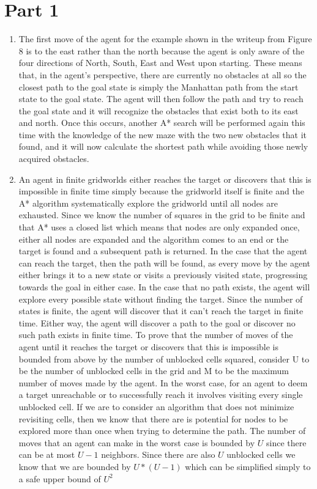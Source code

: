 \documentclass{article}
\begin{document}
\section*{Part 1}
\begin{enumerate}[label=\alph*.]
    \item  The first move of the agent for the example shown in the writeup from Figure 8 is to the east rather than the north because the agent is only aware of the four directions of North, South, East and West upon starting. These means that, in the agent's perspective, there are currently no obstacles at all so the closest path to the goal state is simply the Manhattan path from the start state to the goal state. The agent will then follow the path and try to reach the goal state and it will recognize the obstacles that exist both to its east and north. Once this occurs, another A* search will be performed again this time with the knowledge of the new maze with the two new obstacles that it found, and it will now calculate the shortest path while avoiding those newly acquired obstacles.

    \item An agent in finite gridworlds either reaches the target or discovers that this is impossible in finite time simply because the gridworld itself is finite and the A* algorithm systematically explore the gridworld until all nodes are exhausted. Since we know the number of squares in the grid to be finite and that A* uses a closed list which means that nodes are only expanded once, either all nodes are expanded and the algorithm comes to an end or the target is found and a subsequent path is returned. In the case that the agent can reach the target, then the path will be found, as every move by the agent either brings it to a new state or visits a previously visited state, progressing towards the goal in either case. In the case that no path exists, the agent will explore every possible state without finding the target. Since the number of states is finite, the agent will discover that it can't reach the target in finite time. Either way, the agent will discover a path to the goal or discover no such path exists in finite time. To prove that the number of moves of the agent until it reaches the target or discovers that this is impossible is bounded from above by the number of unblocked cells squared, consider U to be the number of unblocked cells in the grid and M to be the maximum number of moves made by the agent. In the worst case, for an agent to deem a target unreachable or to successfully reach it involves visiting every single unblocked cell. If we are to consider an algorithm that does not minimize revisiting cells, then we know that there are is potential for nodes to be explored more than once when trying to determine the path. The number of moves that an agent can make in the worst case is bounded by $U$ since there can be at most $U-1$ neighbors. Since there are also $U$ unblocked cells we know that we are bounded by $U*(U-1)$ which can be simplified simply to a safe upper bound of $U^2$
\end{enumerate}
\end{document}
